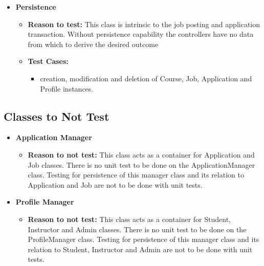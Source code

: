 \documentclass[12pt]{report}
\begin{document}
        \begin{itemize}
        \item \textbf{Persistence}
        \begin{itemize}
            \item \textbf{Reason to test:} This class is intrinsic to the job posting and application transaction. Without persistence capability the controllers have no data from which to derive the desired outcome
            \item \textbf{Test Cases:} 
            \begin{itemize}
                \item creation, modification and deletion of Course, Job, Application and Profile instances. 
            \end{itemize}
        \end{itemize}
        
    \end{itemize}
    
    \subsection{Classes to Not Test}
    \begin{itemize}
    	\item \textbf{Application Manager}
    	\begin{itemize}
    		\item \textbf{Reason to not test:} This class acts as a container for Application and Job classes. There is no unit test to be done on the ApplicationManager class. Testing for persistence of this manager class and its relation to Application and Job are not to be done with unit tests.
    	\end{itemize}
    \end{itemize}
    
    \begin{itemize}
    	\item \textbf{Profile Manager}
    	\begin{itemize}
    		\item \textbf{Reason to not test:} This class acts as a container for Student, Instructor and Admin classes. There is no unit test to be done on the ProfileManager class. Testing for persistence of this manager class and its relation to Student, Instructor and Admin are not to be done with unit tests.
    	\end{itemize}
    \end{itemize}
    
\end{document}
